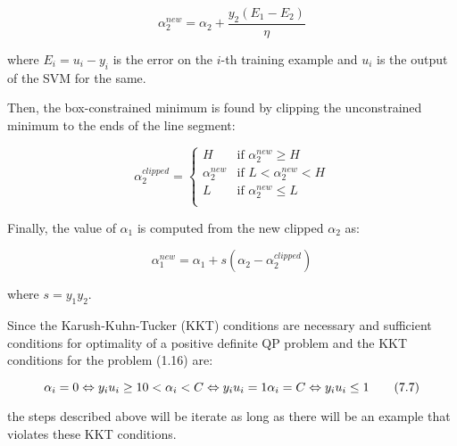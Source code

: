 \begin{equation}
	\alpha_2^{new} = \alpha_2 + \frac{y_2(E_1 - E_2)}{\eta} \tag{7.4}
\end{equation}

where $E_i = u_i - y_i$ is the error on the $i$-th training example and $u_i$ is the output of the SVM for the same.

Then, the box-constrained minimum is found by clipping the unconstrained minimum to the ends of the line segment:

\begin{equation}
    \alpha_2^{clipped} =
        \begin{cases}
            H & \text{if } \alpha_2^{new} \geq H \\
            \alpha_2^{new} & \text{if } L < \alpha_2^{new} < H \\
            L & \text{if } \alpha_2^{new} \leq L \\
        \end{cases} \tag{7.5}
\end{equation}

Finally, the value of $\alpha_1$ is computed from the new clipped $\alpha_2$ as:

\begin{equation}
	\alpha_1^{new} = \alpha_1 + s (\alpha_2 - \alpha_2^{clipped}) \tag{7.6}
\end{equation}

where $s = y_1 y_2$.

Since the Karush-Kuhn-Tucker (KKT) conditions are necessary and sufficient conditions for optimality of a positive definite QP problem and the KKT conditions for the problem (1.16) are:

\begin{equation}
	\alpha_i = 0 \Leftrightarrow y_i u_i \geq 1 \\
	0 < \alpha_i < C \Leftrightarrow y_i u_i = 1 \\
	\alpha_i = C \Leftrightarrow y_i u_i \leq 1 \tag{7.7}
\end{equation}

the steps described above will be iterate as long as there will be an example that violates these KKT conditions.
